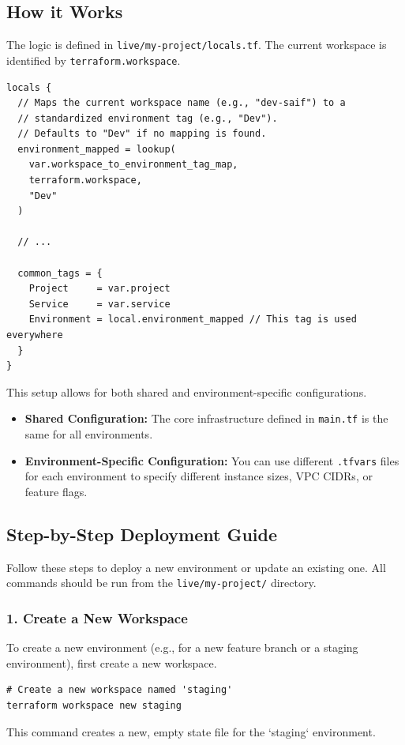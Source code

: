 \documentclass[a4paper,11pt]{article}
\begin{document}
\subsection{How it Works}
The logic is defined in \texttt{live/my-project/locals.tf}. The current workspace is identified by \texttt{terraform.workspace}.

\begin{verbatim}
locals {
  // Maps the current workspace name (e.g., "dev-saif") to a 
  // standardized environment tag (e.g., "Dev").
  // Defaults to "Dev" if no mapping is found.
  environment_mapped = lookup(
    var.workspace_to_environment_tag_map, 
    terraform.workspace, 
    "Dev"
  )

  // ...
  
  common_tags = {
    Project     = var.project
    Service     = var.service
    Environment = local.environment_mapped // This tag is used everywhere
  }
}
\end{verbatim}

This setup allows for both shared and environment-specific configurations.
\begin{itemize}
    \item \textbf{Shared Configuration:} The core infrastructure defined in \texttt{main.tf} is the same for all environments.
    \item \textbf{Environment-Specific Configuration:} You can use different \texttt{.tfvars} files for each environment to specify different instance sizes, VPC CIDRs, or feature flags.
\end{itemize}

\subsection{Step-by-Step Deployment Guide}
Follow these steps to deploy a new environment or update an existing one. All commands should be run from the \texttt{live/my-project/} directory.

\subsubsection{1. Create a New Workspace}
To create a new environment (e.g., for a new feature branch or a staging environment), first create a new workspace.
\begin{verbatim}
# Create a new workspace named 'staging'
terraform workspace new staging
\end{verbatim}
This command creates a new, empty state file for the `staging` environment.
\end{document}
